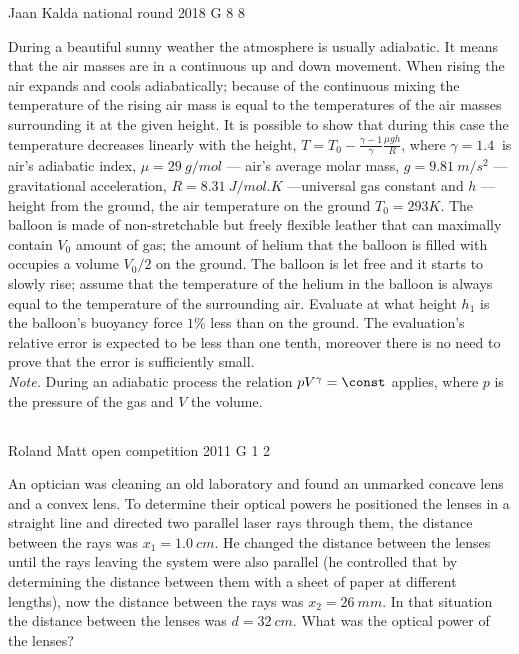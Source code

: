 \documentclass[11pt]{article}
\begin{document}
{Jaan Kalda} %
{national round} %
{2018} %
{G 8} %
{8} %
{

\ifEngStatement
During a beautiful sunny weather the atmosphere is usually adiabatic. It means that the air masses are in a continuous up and down movement. When rising the air expands and cools adiabatically; because of the continuous mixing the temperature of the rising air mass is equal to the temperatures of the air masses surrounding it at the given height. It is possible to show that during this case the temperature decreases linearly with the height, $T=T_0-\frac{\gamma-1}\gamma\frac{\mu g h}R$, where $\gamma=\SI{1.4}{	}$ is air's adiabatic index, $\mu=\SI{29}{g/mol}$ — air's average molar mass, $g=\SI{9.81}{m/s^2}$ — gravitational acceleration, $R=\SI{8.31}{J/mol.K}$ —universal gas constant and $h$ — height from the ground, the air temperature on the ground $T_0=\SI{293}K$. The balloon is made of non-stretchable but freely flexible leather that can maximally contain $V_0$ amount of gas; the amount of helium that the balloon is filled with occupies a volume $V_0/2$ on the ground. The balloon is let free and it starts to slowly rise; assume that the temperature of the helium in the balloon is always equal to the temperature of the surrounding air. Evaluate at what height $h_1$ is the balloon's buoyancy force $1\%$ less than on the ground. The evaluation's relative error is expected to be less than one tenth, moreover there is no need to prove that the error is sufficiently small.\\
\emph{Note.}  During an adiabatic process the relation $pV^\gamma = \const$ applies, where $p$ is the pressure of the gas and $V$ the volume.
\fi
}
\newpage\subsection{\protect{}}

{Roland Matt} %
{open competition} %
{2011} %
{G 1} %
{2} %
{

\ifEngStatement
An optician was cleaning an old laboratory and found an unmarked concave lens and a convex lens. To determine their optical powers he positioned the lenses in a straight line and directed two parallel laser rays through them, the distance between the rays was $x_{1}=\SI{1,0}{cm}$. He changed the distance between the lenses until the rays leaving the system were also parallel (he controlled that by determining the distance between them with a sheet of paper at different lengths), now the distance between the rays was $x_{2}=\SI{26}{mm}$. In that situation the distance between the lenses was $d=\SI{32}{cm}$. What was the optical power of the lenses?
\fi
}
\end{document}
